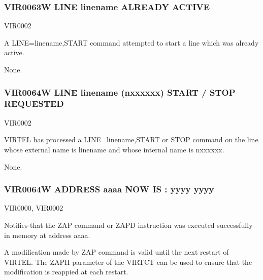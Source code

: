 \documentclass[letterpaper,10pt,english]{sphinxmanual}
\begin{document}
\subsubsection{VIR0063W LINE linename ALREADY ACTIVE}
\label{\detokenize{messages:vir0063w-line-linename-already-active}}\begin{description}
\sphinxAtStartPar
VIR0002

\sphinxAtStartPar
A LINE=linename,START command attempted to start a line which was already active.

\sphinxAtStartPar
None.

\end{description}


\subsubsection{VIR0064W LINE linename (n\sphinxhyphen{}xxxxxx) START / STOP REQUESTED}
\label{\detokenize{messages:vir0064w-line-linename-n-xxxxxx-start-stop-requested}}\begin{description}
\sphinxAtStartPar
VIR0002

\sphinxAtStartPar
VIRTEL has processed a LINE=linename,START or STOP command on the line whose external name is linename and whose internal name is n\sphinxhyphen{}xxxxxx.

\sphinxAtStartPar
None.

\end{description}


\subsubsection{VIR0064W ADDRESS aaaa NOW IS :  yyyy yyyy}
\label{\detokenize{messages:vir0064w-address-aaaa-now-is-yyyy-yyyy}}\begin{description}
\sphinxAtStartPar
VIR0000, VIR0002

\sphinxAtStartPar
Notifies that the ZAP command or ZAPD instruction was executed successfully in memory at address aaaa.

\sphinxAtStartPar
A modification made by ZAP command is valid until the next restart of VIRTEL. The ZAPH parameter of the VIRTCT can be used to ensure that the modification is reappied at each restart.

\end{description}
\end{document}
